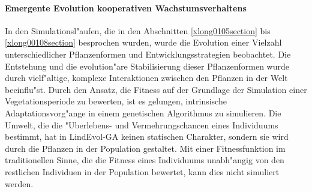 % 
% 

\paragraph{Emergente Evolution kooperativen Wachstumsverhaltens}
In den Simulationsl"aufen, die in den Abschnitten \ref{xlong0105section} bis \ref{xlong00108section}
besprochen wurden, wurde die Evolution einer Vielzahl unterschiedlicher Pflanzenformen und Entwicklungsstrategien
beobachtet. Die Entstehung und die evolution"are Stabilisierung dieser Pflanzenformen wurde durch vielf"altige,
komplexe Interaktionen zwischen den Pflanzen in der Welt beeinflu"st. Durch den Ansatz, die Fitness auf
der Grundlage der Simulation einer Vegetationsperiode zu bewerten, ist es gelungen, intrinsische Adaptationsvorg"ange
\cite{Packard89} in einem genetischen Algorithmus zu simulieren. Die Umwelt, die die "Uberlebens- und Vermehrungschancen
eines Individuums bestimmt, hat in LindEvol-GA keinen statischen Charakter, sondern sie wird durch die Pflanzen in
der Population gestaltet. Mit einer Fitnessfunktion im traditionellen Sinne, die die
Fitness eines Individuums unabh"angig von den restlichen Individuen in der Population bewertet, kann dies
nicht simuliert werden.


